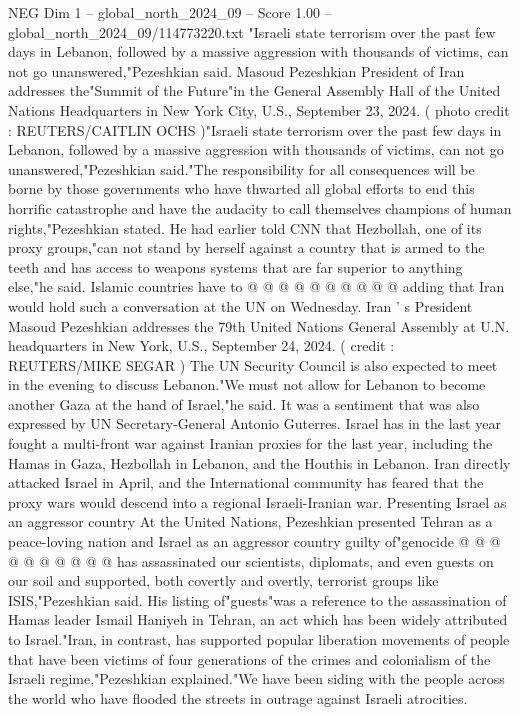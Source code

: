 \begin{textsample}{NEG Dim 1 – global\_north\_2024\_09 – Score 1.00 – global\_north\_2024\_09/114773220.txt}  \label{ex:f1_neg_025}
"Israeli state terrorism over the past few days in Lebanon, followed by a massive aggression with thousands of victims, can not go unanswered,"Pezeshkian said.
Masoud Pezeshkian President of Iran addresses the"Summit of the Future"in the General Assembly Hall of the United Nations Headquarters in New York City, U.S., September 23, 2024. ( photo credit : REUTERS/CAITLIN OCHS )"Israeli state terrorism over the past few days in Lebanon, followed by a massive aggression with thousands of victims, can not go unanswered,"Pezeshkian said."The responsibility for all consequences will be borne by those governments who have thwarted all global efforts to end this horrific catastrophe and have the audacity to call themselves champions of human rights,"Pezeshkian stated.
He had earlier told CNN that Hezbollah, one of its proxy groups,"can not stand by herself against a country that is armed to the teeth and has access to weapons systems that are far superior to anything else,"he said.
Islamic countries have to @ @ @ @ @ @ @ @ @ @ adding that Iran would hold such a conversation at the UN on Wednesday.
Iran ' s President Masoud Pezeshkian addresses the 79th United Nations General Assembly at U.N. headquarters in New York, U.S., September 24, 2024. ( credit : REUTERS/MIKE SEGAR ) The UN Security Council is also expected to meet in the evening to discuss Lebanon."We must not allow for Lebanon to become another Gaza at the hand of Israel,"he said.
It was a sentiment that was also expressed by UN Secretary-General Antonio Guterres.
Israel has in the last year fought a multi-front war against Iranian proxies for the last year, including the Hamas in Gaza, Hezbollah in Lebanon, and the Houthis in Lebanon.
Iran directly attacked Israel in April, and the International community has feared that the proxy wars would descend into a regional Israeli-Iranian war.
Presenting Israel as an aggressor country At the United Nations, Pezeshkian presented Tehran as a peace-loving nation and Israel as an aggressor country guilty of"genocide @ @ @ @ @ @ @ @ @ @ has assassinated our scientists, diplomats, and even guests on our soil and supported, both covertly and overtly, terrorist groups like ISIS,"Pezeshkian said.
His listing of"guests"was a reference to the assassination of Hamas leader Ismail Haniyeh in Tehran, an act which has been widely attributed to Israel."Iran, in contrast, has supported popular liberation movements of people that have been victims of four generations of the crimes and colonialism of the Israeli regime,"Pezeshkian explained."We have been siding with the people across the world who have flooded the streets in outrage against Israeli atrocities.

\end{textsample}
